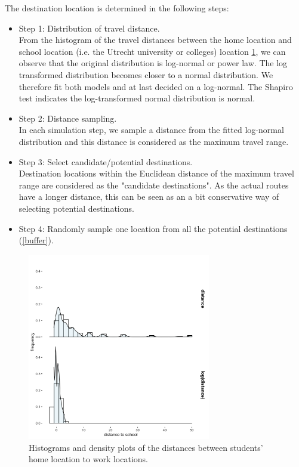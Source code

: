 \documentclass[]{article}
\begin{document}
The destination location is determined in the following steps:     
\begin{itemize}
    \item Step 1: Distribution of travel distance. \\ From the histogram of the travel distances between the home location and school location (i.e. the Utrecht university or colleges) location \cref{stu_work_hist}, we can observe that the original distribution is log-normal or power law. The log transformed distribution becomes closer to a normal distribution. We therefore fit both models and at last decided on a log-normal. The Shapiro test indicates the log-transformed normal distribution is normal. 
    
    \item Step 2: Distance sampling. \\ In each simulation step, we sample a distance from the fitted log-normal distribution and this distance is considered as the maximum travel range.
    
    \item Step 3: Select candidate/potential destinations. \\ Destination locations within the Euclidean distance of the maximum travel range are considered as the "candidate destinations". As the actual routes have a longer distance, this can be seen as an a bit conservative way of selecting potential destinations. 
    
    \item Step 4: Randomly sample one location from all the potential destinations (\cref{buffer}).
    
\end{itemize}
\begin{figure}[!h]
    \centering
    \includegraphics[width=8cm]{figure/ditance_to_school.png}
    \caption{Histograms and density plots of the distances between students' home location to work locations. }
    \label{stu_work_hist}
\end{figure}
\end{document}

